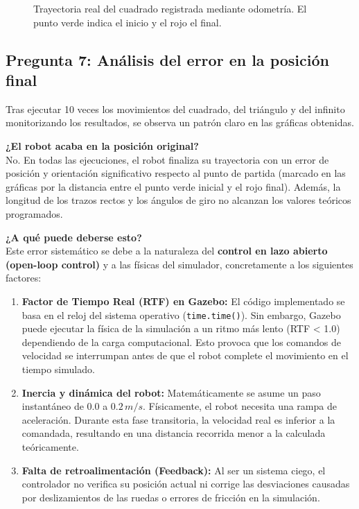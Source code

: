\begin{figure}[H]
	\centering
	\caption{Trayectoria real del cuadrado registrada mediante odometría. El punto verde indica el inicio y el rojo el final.}
	\label{fig:grafica_odom}
\end{figure}

\subsection*{Pregunta 7: Análisis del error en la posición final}

Tras ejecutar 10 veces los movimientos del cuadrado, del triángulo y del infinito monitorizando los resultados, se observa un patrón claro en las gráficas obtenidas.

\textbf{¿El robot acaba en la posición original?} \\
No. En todas las ejecuciones, el robot finaliza su trayectoria con un error de posición y orientación significativo respecto al punto de partida (marcado en las gráficas por la distancia entre el punto verde inicial y el rojo final). Además, la longitud de los trazos rectos y los ángulos de giro no alcanzan los valores teóricos programados.

\textbf{¿A qué puede deberse esto?} \\
Este error sistemático se debe a la naturaleza del \textbf{control en lazo abierto (open-loop control)} y a las físicas del simulador, concretamente a los siguientes factores:

\begin{enumerate}
	\item \textbf{Factor de Tiempo Real (RTF) en Gazebo:} El código implementado se basa en el reloj del sistema operativo (\texttt{time.time()}). Sin embargo, Gazebo puede ejecutar la física de la simulación a un ritmo más lento (RTF < 1.0) dependiendo de la carga computacional. Esto provoca que los comandos de velocidad se interrumpan antes de que el robot complete el movimiento en el tiempo simulado.
	\item \textbf{Inercia y dinámica del robot:} Matemáticamente se asume un paso instantáneo de $0.0$ a $0.2\,m/s$. Físicamente, el robot necesita una rampa de aceleración. Durante esta fase transitoria, la velocidad real es inferior a la comandada, resultando en una distancia recorrida menor a la calculada teóricamente.
	\item \textbf{Falta de retroalimentación (Feedback):} Al ser un sistema ciego, el controlador no verifica su posición actual ni corrige las desviaciones causadas por deslizamientos de las ruedas o errores de fricción en la simulación.
\end{enumerate}

